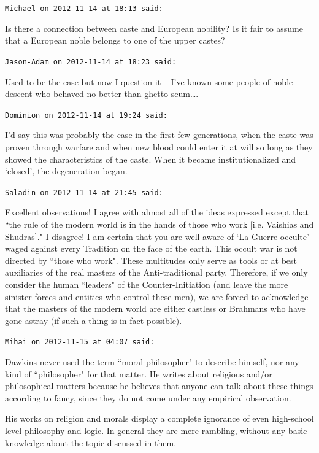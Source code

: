 \begin{footnotesize}
\begin{sffamily}
\texttt{Michael on 2012-11-14 at 18:13 said: }

Is there a connection between caste and European nobility? Is it fair to assume that a European noble belongs to one of the upper castes?


\hfill

\texttt{Jason-Adam on 2012-11-14 at 18:23 said: }

Used to be the case but now I question it – I've known some people of noble descent who behaved no better than ghetto scum….


\hfill

\texttt{Dominion on 2012-11-14 at 19:24 said: }

I'd say this was probably the case in the first few generations, when the caste was proven through warfare and when new blood could enter it at will so long as they showed the characteristics of the caste. When it became institutionalized and `closed', the degeneration began.


\hfill

\texttt{Saladin on 2012-11-14 at 21:45 said: }

Excellent observations! I agree with almost all of the ideas expressed except that ``the rule of the modern world is in the hands of those who work [i.e. Vaishias and Shudras]." I disagree! I am certain that you are well aware of `La Guerre occulte' waged against every Tradition on the face of the earth. This occult war is not directed by ``those who work". These multitudes only serve as tools or at best auxiliaries of the real masters of the Anti-traditional party. Therefore, if we only consider the human ``leaders" of the Counter-Initiation (and leave the more sinister forces and entities who control these men), we are forced to acknowledge that the masters of the modern world are either castless or Brahmans who have gone astray (if such a thing is in fact possible).


\hfill

\texttt{Mihai on 2012-11-15 at 04:07 said: }

Dawkins never used the term ``moral philosopher" to describe himself, nor any kind of ``philosopher" for that matter. He writes about religious and/or philosophical matters because he believes that anyone can talk about these things according to fancy, since they do not come under any empirical observation. 

His works on religion and morals display a complete ignorance of even high-school level philosophy and logic. In general they are mere rambling, without any basic knowledge about the topic discussed in them.



\end{sffamily}
\end{footnotesize}
